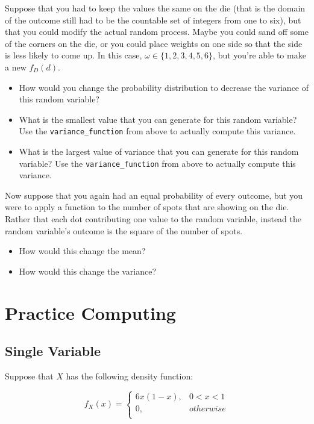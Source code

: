 \documentclass[
]{book}
\providecommand{\tightlist}{%
  \setlength{\itemsep}{0pt}\setlength{\parskip}{0pt}}
\theoremstyle{definition}
\theoremstyle{definition}
\theoremstyle{definition}
\theoremstyle{definition}
\theoremstyle{remark}
\begin{document}
Suppose that you had to keep the values the same on the die (that is the domain of the outcome still had to be the countable set of integers from one to six), but that you could modify the actual random process. Maybe you could sand off some of the corners on the die, or you could place weights on one side so that the side is less likely to come up. In this case, \(\omega \in \{1,2,3,4,5,6\}\), but you're able to make a new \(f_{D}(d)\).

\begin{itemize}
\tightlist
\item
  How would you change the probability distribution to decrease the variance of this random variable?
\item
  What is the smallest value that you can generate for this random variable? Use the \texttt{variance\_function} from above to actually compute this variance.
\item
  What is the largest value of variance that you can generate for this random variable? Use the \texttt{variance\_function} from above to actually compute this variance.
\end{itemize}

Now suppose that you again had an equal probability of every outcome, but you were to apply a function to the number of spots that are showing on the die. Rather that each dot contributing one value to the random variable, instead the random variable's outcome is the square of the number of spots.

\begin{itemize}
\tightlist
\item
  How would this change the mean?
\item
  How would this change the variance?
\end{itemize}

\hypertarget{practice-computing}{%
\section{Practice Computing}\label{practice-computing}}

\hypertarget{single-variable}{%
\subsection{Single Variable}\label{single-variable}}

Suppose that \(X\) has the following density function:

\[
  f_{X}(x) = \begin{cases} 
    6x(1 - x), & 0 < x < 1 \\ 
    0, & otherwise \\ 
  \end{cases}
\]
\end{document}
